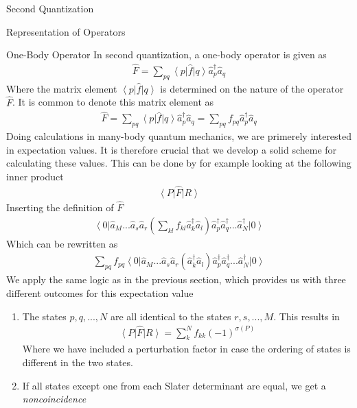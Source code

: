 \documentclass[twoside,english]{uiofysmaster}
\begin{document}
\begin{chapter}{Second Quantization}
\begin{section}{Representation of Operators}
		\begin{subsection}{One-Body Operator}
			In second quantization, a one-body operator is given as
			\begin{align}
				\hat F = \sum_{pq} \left< p \right| \hat f \left| q \right> \hat a_p^\dagger \hat a_q 
			\end{align}
			Where the matrix element $\left< p \right| \hat f \left| q \right>$ is determined on the nature of the operator $\hat F$. It is common to denote this matrix element as
			\begin{align}
				\hat F = \sum_{pq} \left< p \right| \hat f \left| q \right> \hat a_p^\dagger \hat a_q = \sum_{pq} f_{pq} \hat a_p^\dagger \hat a_q
			\end{align}
			Doing calculations in many-body quantum mechanics, we are primerely interested in expectation values. It is therefore crucial that we develop a solid scheme for calculating these values. This can be done by for example looking at the following inner product 
			\begin{align}
				\left< P \right| \hat F \left| R \right> 
			\end{align}
			Inserting the definition of $\hat F$
			\begin{align}
				\left< 0 \right| \hat a_M ... \hat a_s \hat a_r \left( \sum_{kl} f_{kl} \hat a_k^\dagger \hat a_l \right) \hat a_p^\dagger \hat a_q^\dagger ... \hat a_N^\dagger \left| 0 \right>
			\end{align}
			Which can be rewritten as
			\begin{align}
				\sum_{pq} f_{pq} \left< 0 \right| \hat a_M ... \hat a_s \hat a_r (\hat a_k^\dagger \hat a_l) \hat a_p^\dagger \hat a_q^\dagger ... \hat a_N^\dagger \left| 0 \right>
			\end{align}
			We apply the same logic as in the previous section, which provides us with three different outcomes for this expectation value
			\begin{enumerate}
				\item The states $p,q,...,N$ are all identical to the states $r,s,...,M$. This results in
				\begin{align}
					\left< P \right| \hat F \left| R \right> = \sum_k^N f_{kk} (-1)^{\sigma(P)}
				\end{align}
				Where we have included a perturbation factor in case the ordering of states is different in the two states. 
				\item If all states except one from each Slater determinant are equal, we get a \textit{noncoincidence} \cite{ShavittAndBartlett}

\end{enumerate}
\end{subsection}
\end{section}
\end{chapter}
\end{document}

